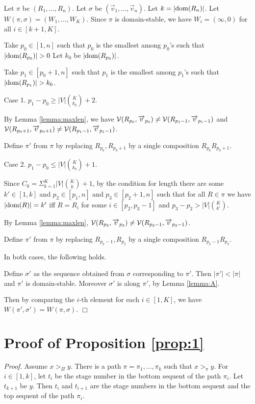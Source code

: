 Let $\pi$ be $(R_1,\ldots,R_n)$.
Let $\sigma$ be $(\Vec v_1,\ldots,\Vec v_n)$.
Let $k=|{\rm dom}(R_n)|$.
Let $W(\pi,\sigma)=(W_1,\ldots,W_K)$.
Since $\pi$ is domain-stable, we have $W_i=(\infty,0)$ for all $i \in [k+1,K]$.

Take $p_0 \in [1,n]$ such that
$p_0$ is the smallest among $p_0$'s such that
$|\dom(R_{p_0})|>0$
Let $k_0$ be $|{\rm dom}(R_{p_0})|$.

Take $p_1 \in [p_0+1,n]$ such that 
$p_1$ is the smallest among $p_1$'s such that
$|\dom(R_{p_1})|>k_0$.

Case 1. $p_1-p_0 \ge |V|{K \choose k_0}+2$.

By Lemma \ref{lemma:maxlen}, we have
${{\mathcal V}}(R_{p_0},\overrightarrow v_{p_0}) \ne {{\mathcal V}}(R_{p_1-1},\overrightarrow v_{p_1-1})$
and
${{\mathcal V}}(R_{p_0+1},\overrightarrow v_{p_0+1}) \ne {{\mathcal V}}(R_{p_1-1},\overrightarrow v_{p_1-1})$.

Define $\pi'$ from $\pi$ by 
replacing $R_{p_0},R_{p_0+1}$ by a single composition $R_{p_0}R_{p_0+1}$.

Case 2. $p_1-p_0 \le |V|{K \choose k_0}+1$.

Since $C_0 = \Sigma_{k=1}^K|V|{K \choose k}+1$,
by the condition for length
there are some 
$k' \in [1,k]$
and
$p_2 \in [p_1,n]$
and
$p_3 \in [p_2+1,n]$
such that
for all $R \in \pi$ we have
$|{\rm dom}(R)|=k'$ iff $R=R_i$ for some $i \in [p_2,p_3-1]$
and
$p_3-p_2 > |V|{K \choose k'}$.

By Lemma \ref{lemma:maxlen},
${{\mathcal V}}(R_{p_2},\overrightarrow v_{p_2}) \ne {{\mathcal V}}(R_{p_3-1},\overrightarrow v_{p_3-1})$.

Define $\pi'$ from $\pi$ by 
replacing $R_{p_2-1},R_{p_2}$ by a single composition $R_{p_2-1}R_{p_2}$.

In both cases, the following holds.

Define $\sigma'$ as the sequence obtained from $\sigma$
corresponding to $\pi'$.
Then $|\pi'|<|\pi|$ and $\pi'$ is domain-stable.
Moreover $\sigma'$ is along $\pi'$, by Lemma \ref{lemma:A}.

Then by comparing the $i$-th element for each $i \in [1,K]$,
we have
$W(\pi',\sigma')=W(\pi,\sigma)$.
$\Box$

\section{Proof of Proposition \ref{prop:1}}

{\em Proof.}
Assume $x >_\Pi y$.
There is a path $\pi=\pi_1,\ldots,\pi_k$ such that $x >_\pi y$.
For $i \in [1,k]$, let $t_i$ be the stage number in the bottom sequent
of the path $\pi_i$.
Let $t_{k+1}$ be $y$.
Then $t_i$ and $t_{i+1}$ are the stage numbers in 
the bottom sequent and the top sequent of the path $\pi_i$.

